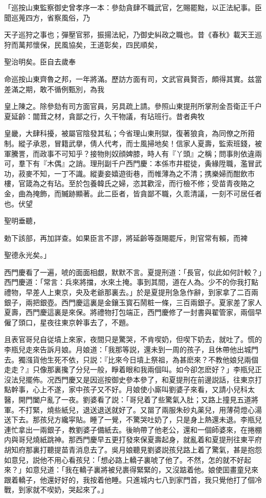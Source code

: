 \begin{myquote}[\markfont]
「巡按山東監察御史曾孝序一本：參劾貪肆不職武官，乞賜罷黜，以正法紀事。臣聞巡蒐四方，省察風俗，乃

天子巡狩之事也；彈壓官邪，振揚法紀，乃御史糾政之職也。昔《春秋》載天王巡狩而萬邦懷保，民風協矣，王道彰矣，四民順矣，

聖治明矣。臣自去歲奉

命巡按山東齊魯之邦，一年將滿。歷訪方面有司，文武官員賢否，頗得其實。兹當差滿之期，敢不循例甄別，為我

皇上陳之。除參劾有司方面官員，另具疏上請。參照山東提刑所掌刑金吾衛正千户夏延齡：闒茸之材，貪鄙之行，久干物議，有玷班行。昔者典牧

皇畿，大肆科擾，被屬官陰發其私；今省理山東刑獄，復著狼貪，為同僚之所箝制。縱子承恩，冒籍武擧，倩人代考，而士風掃地矣！信家人夏壽，監索班錢，被軍騰詈，而政事不可知乎？接物則奴顔婢膝，時人有『丫頭』之稱；問事則依違兩可，羣下有『木偶』之誚。理刑副千户西門慶：本係市井棍徒，夤緣陞職，濫冒武功，菽麥不知，一丁不識。縱妻妾嬉遊街巷，而帷薄為之不清；携樂婦而酣飲市樓，官箴為之有玷。至於包養韓氏之婦，恣其歡淫，而行檢不修；受苗青夜賂之金，曲為掩飾，而贓跡顯著。此二臣者，皆貪鄙不職，久乖清議，一刻不可居任者也。伏望

聖明垂聽，

勅下該部，再加詳查。如果臣言不謬，將延齡等亟賜罷斥，則官常有賴，而裨

聖德永光矣。」
\end{myquote}

西門慶看了一遍，唬的面面相覷，默默不言。夏提刑道：「長官，似此如何計較？」西門慶道：「常言：兵來將擋，水來土掩。事到其間，道在人為。少不的你我打點禮物，早差人上東京，央及老爺那裏去。」於是夏提刑急急作辭，到家拿了二百兩銀子，兩把銀壺。西門慶這裏是金鑲玉寳石鬧粧一條，三百兩銀子。夏家差了家人夏壽，西門慶這裏是來保。將禮物打包端正，西門慶修了一封書與翟管家，兩個早僱了頭口，星夜往東京幹事去了，不題。

且表官哥兒自従墳上來家，夜間只是驚哭，不肯喫奶，但喫下奶去，就吐了。慌的李瓶兒走來告訴月娘。月娘道：「我那等説，還未到一周的孩子，且休帶他出城門去。獨漒貨他生死不依，只説：『比來今日墳上祭祖，為甚麽來？不教他娘兒兩個走走？』只像那裏攙了分兒一般，睜着眼和我兩個叫。如今卻怎麽好？」李瓶兒正沒法兒擺佈。况西門慶又是因巡按御史參本參了，和夏提刑在前邊説話，往東京打點幹事，心上不遂，家中孩子又不好。月娘使小廝叫劉婆子來看，又請小兒科太醫，開門闔户亂了一夜。劉婆看了説：「哥兒着了些驚氣入肚；又路上撞見五道將軍。不打緊，燒些紙兒，退送退送就好了。又㽞了兩服朱砂丸薬兒，用薄荷燈心湯送下去。那孩兒方纔寜貼。睡了一覺，不驚哭吐奶了，只是身上熱還未退。李瓶兒連忙拿出一兩銀子，教劉婆子備紙去。後晌帶了他老公，還和一個師婆來，在捲棚内與哥兒燒紙跳神。那西門慶早五更打發來保夏壽起身，就亂着和夏提刑往東平府胡知府那裏打聽提苗青消息去了。吳月娘聽見劉婆説孩兒路上着了驚氣，甚是抱怨如意兒，説他不用心看孩兒：「想必路上轎子裏唬了他了。不然，怎的就不好起來？」如意兒道：「我在轎子裏將被兒裹得緊緊的，又沒踮着他。娘使囬畫童兒來跟着轎子，他還好好的，我按着他睡。只進城内七八到家門首，我只覺他打了個冷戰，到家就不喫奶，哭起來了。」

